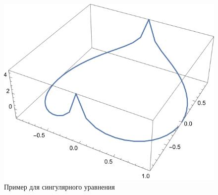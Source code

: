 \documentclass{article}
\begin{document}
	\begin{figure}[H]
        \centering
        \includegraphics[width=\textwidth]{singular.png}
        \caption{Пример для сингулярного уравнения}
    \end{figure}
\end{document}
